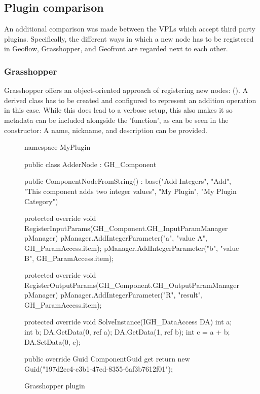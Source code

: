 \subsection{Plugin comparison}

An additional comparison was made between the VPLs which accept third party plugins.
Specifically, the different ways in which a new node has to be registered in Geoflow, Grasshopper, and Geofront are regarded next to each other.

\subsubsection{Grasshopper}

Grasshopper offers an object-oriented approach of registering new nodes: ().
A derived class has to be created and configured to represent an addition operation in this case.
While this does lead to a verbose setup, this also makes it so metadata can be included alongside the 'function', as can be seen in the constructor: A name, nickname, and description can be provided.

\begin{figure}
\centering
\begin{code}
namespace MyPlugin
{
    public class AdderNode : GH_Component
    {
        public ComponentNodeFromString()
          : base("Add Integers",
            "Add",
            "This component adds two integer values",
            "My Plugin",
            "My Plugin Category")
        {
        }

        protected override void RegisterInputParams(GH_Component.GH_InputParamManager pManager)
        {
            pManager.AddIntegerParameter("a", "value A", GH_ParamAccess.item);
            pManager.AddIntegerParameter("b", "value B", GH_ParamAccess.item);
        }

        protected override void RegisterOutputParams(GH_Component.GH_OutputParamManager pManager)
        {
            pManager.AddIntegerParameter("R", "result", GH_ParamAccess.item);
        }

        protected override void SolveInstance(IGH_DataAccess DA)
        {
            int a;
            int b;
            DA.GetData(0, ref a);
            DA.GetData(1, ref b);
            int c = a + b;
            DA.SetData(0, c);
        }

        public override Guid ComponentGuid
        {
            get { return new Guid("197d2ec4-c3b1-47ed-8355-6af3b7612f01"); }
        }
    }
}
\end{code}
\caption[]{Grasshopper plugin}
\label{fig:boilerplate:grasshopper}
\end{figure}


